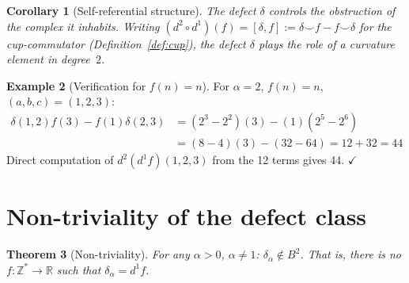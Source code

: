 \documentclass[11pt,a4paper]{article}
\theoremstyle{plain}
\newtheorem{theorem}{Theorem}[section]
\newtheorem{corollary}[theorem]{Corollary}
\theoremstyle{definition}
\newtheorem{example}[theorem]{Example}
\theoremstyle{remark}
\newcommand{\ZZ}{\mathbb{Z}}
\newcommand{\RR}{\mathbb{R}}
\begin{document}
\begin{corollary}[Self-referential structure]
\label{cor:self-ref}
The defect $\delta$ controls the obstruction of the complex it 
inhabits. Writing $(d^2 \circ d^1)(f) = [\delta, f] := \delta \smile f
- f \smile \delta$ for the cup-commutator (Definition~\ref{def:cup}),
the defect $\delta$ plays the role of a curvature element in
degree~$2$.
\end{corollary}

\begin{example}[Verification for $f(n) = n$]
\label{ex:verify-fn}
For $\alpha = 2$, $f(n) = n$, $(a,b,c) = (1, 2, 3)$:
\begin{align*}
\delta(1,2)f(3) - f(1)\delta(2,3) 
&= (2^3 - 2^2)(3) - (1)(2^5 - 2^6) \\
&= (8-4)(3) - (32-64) = 12 + 32 = 44
\end{align*}
Direct computation of $d^2(d^1 f)(1,2,3)$ from the 12 terms gives 44. 
$\checkmark$
\end{example}

\section{Non-triviality of the defect class}
\label{sec:nontrivial}

\begin{theorem}[Non-triviality]
\label{thm:nontrivial}
For any $\alpha > 0$, $\alpha \neq 1$: $\delta_\alpha \notin B^2$. 
That is, there is no $f : \ZZ^* \to \RR$ such that 
$\delta_\alpha = d^1 f$.
\end{theorem}
\end{document}
